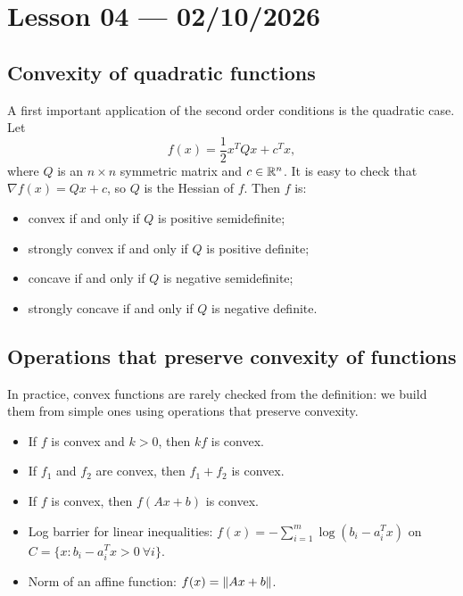 \section{Lesson 04 --- 02/10/2026}

\subsection{Convexity of quadratic functions}

A first important application of the second order conditions is the quadratic case. Let
\[
    f(x) = \frac{1}{2}x^TQx + c^Tx,
\]
where $Q$ is an $n \times n$ symmetric matrix and $c \in \mathbb{R}^n$. It is easy to check that $\nabla f(x) = Qx + c$, so $Q$ is the Hessian of $f$. Then $f$ is:
\begin{itemize}
    \item convex if and only if $Q$ is positive semidefinite;
    \item strongly convex if and only if $Q$ is positive definite;
    \item concave if and only if $Q$ is negative semidefinite;
    \item strongly concave if and only if $Q$ is negative definite.
\end{itemize}

\subsection{Operations that preserve convexity of functions}

In practice, convex functions are rarely checked from the definition: we build them from simple ones using operations that preserve convexity.

\begin{theorem}
\leavevmode
\begin{itemize}
    \item If $f$ is convex and $k > 0$, then $kf$ is convex.
    \item If $f_1$ and $f_2$ are convex, then $f_1 + f_2$ is convex.
    \item If $f$ is convex, then $f(Ax + b)$ is convex.
\end{itemize}
\end{theorem}

\begin{example}
\leavevmode
\begin{itemize}
    \item Log barrier for linear inequalities: $f(x) = -\sum_{i=1}^{m}\log(b_i - a_i^Tx)$ on $C = \{x : b_i - a_i^Tx > 0\ \forall i\}$.
    \item Norm of an affine function: $f(x) = \left\lVert Ax + b \right\rVert$.
\end{itemize}
\end{example}

